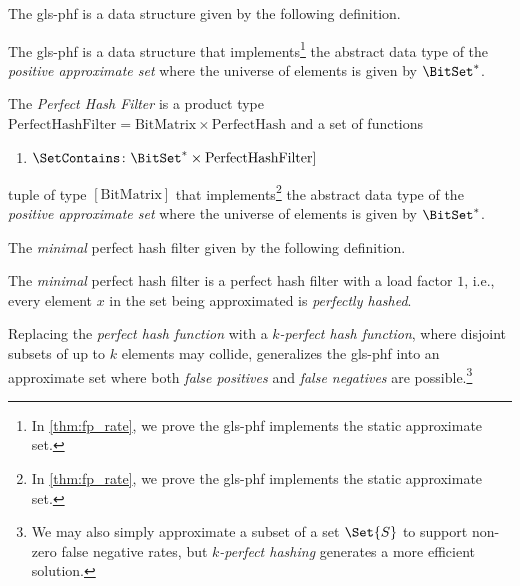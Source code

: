 The \gls{gls-phf} is a data structure given by the following definition.
\begin{definition}
The \gls{gls-phf} is a data structure that implements\footnote{In \cref{thm:fp_rate}, we prove the \gls{gls-phf} implements the static approximate set.} the abstract data type of the \emph{positive approximate set} where the universe of elements is given by $\BitSet^*$.
\end{definition}


The \emph{Perfect Hash Filter} is a product type $\textrm{PerfectHashFilter} = \textrm{BitMatrix} \times \textrm{PerfectHash}$ and a set of functions
\begin{enumerate}
\item $\SetContains \colon \BitSet^* \times \textrm{PerfectHashFilter}]$
\end{enumerate}



tuple of type $[\textrm{BitMatrix}]$ that implements\footnote{In \cref{thm:fp_rate}, we prove the \gls{gls-phf} implements the static approximate set.} the abstract data type of the \emph{positive approximate set} where the universe of elements is given by $\BitSet^*$.


The \emph{minimal} perfect hash filter given by the following definition.
\begin{definition}
The \emph{minimal} perfect hash filter is a perfect hash filter with a load factor $1$, i.e., every element $x$ in the set being approximated is \emph{perfectly hashed}.
\end{definition}
Replacing the \emph{perfect hash function} with a \emph{$k$-perfect hash function}, where disjoint subsets of up to $k$ elements may collide, generalizes the \gls{gls-phf} into an approximate set where both \emph{false positives} and \emph{false negatives} are possible.\footnote{We may also simply approximate a subset of a set $\Set{S}$ to support non-zero false negative rates, but \emph{$k$-perfect hashing} generates a more efficient solution.}






